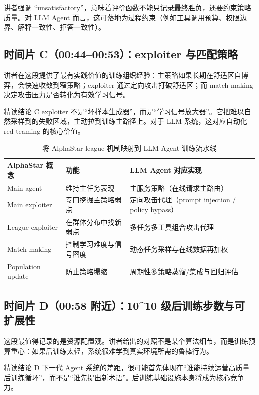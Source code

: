 \documentclass[a4paper]{article}
\begin{document}
讲者强调 ``unsatisfactory''，意味着评价函数不能只记录最终胜负，还要约束策略质量。对 LLM Agent 而言，这可落地为过程约束（例如工具调用预算、权限边界、解释一致性、拒答一致性）。

\subsection{时间片 C（00:44--00:53）：exploiter 与匹配策略}
讲者在这段提供了最有实践价值的训练组织经验：主策略如果长期在舒适区自博弈，会快速收敛到窄策略；exploiter 通过定向攻击打破舒适区；而 match-making 决定攻击压力是否转化为有效学习信号。

\begin{knowledgebox}{精读结论 C}
exploiter 不是``坏样本生成器''，而是``学习信号放大器''。它把难以自然采样到的失败区域，主动拉到训练主路径上。对于 LLM 系统，这对应自动化 red teaming 的核心价值。
\end{knowledgebox}

\begin{table}[H]
\centering
\caption{将 AlphaStar league 机制映射到 LLM Agent 训练流水线}
\begin{tabular}{p{3.0cm}p{4.2cm}p{5.4cm}}
\toprule
AlphaStar 概念 & 功能 & LLM Agent 对应实现 \\
\midrule
Main agent & 维持主任务表现 & 主服务策略（在线请求主路由） \\
Main exploiter & 专门挖掘主策略弱点 & 定向攻击代理（prompt injection / policy bypass） \\
League exploiter & 在群体分布中找新弱点 & 多任务多工具组合攻击代理 \\
Match-making & 控制学习难度与信号密度 & 动态任务采样与在线数据再加权 \\
Population update & 防止策略塌缩 & 周期性多策略蒸馏/集成与回归评估 \\
\bottomrule
\end{tabular}
\end{table}

\subsection{时间片 D（00:58 附近）：10\^{}10 级后训练步数与可扩展性}
这段最值得记录的是资源配置观。讲者给出的对照不是某个算法细节，而是训练预算重心：如果后训练太轻，系统很难学到真实环境所需的鲁棒行为。

\begin{importantbox}{精读结论 D}
下一代 Agent 系统的差距，很可能首先体现在``谁能持续运营高质量后训练循环''，而不是``谁先提出新术语''。后训练基础设施本身将成为核心竞争力。
\end{importantbox}
\end{document}
